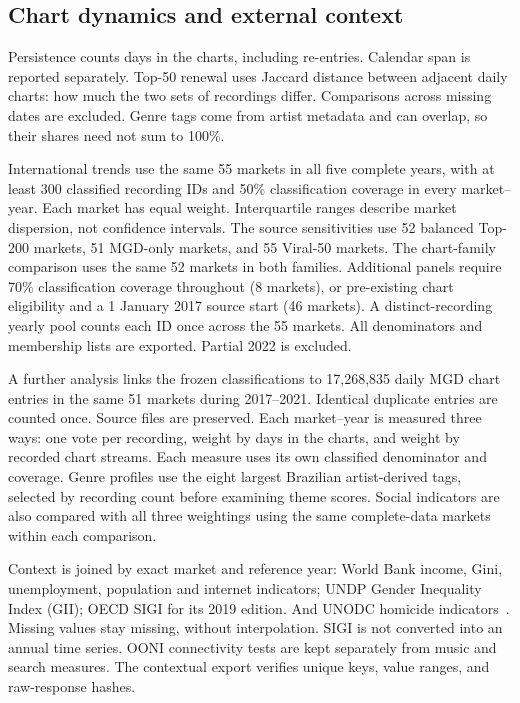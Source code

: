 \documentclass[10pt,a4paper,twocolumn]{article}
\begin{document}
\subsection{Chart dynamics and external context}
Persistence counts days in the charts, including re-entries. Calendar span is reported separately. Top-50 renewal uses Jaccard distance between adjacent daily charts: how much the two sets of recordings differ. Comparisons across missing dates are excluded. Genre tags come from artist metadata and can overlap, so their shares need not sum to 100\%.

International trends use the same 55 markets in all five complete years, with at least 300 classified recording IDs and 50\% classification coverage in every market--year. Each market has equal weight. Interquartile ranges describe market dispersion, not confidence intervals. The source sensitivities use 52 balanced Top-200 markets, 51 MGD-only markets, and 55 Viral-50 markets. The chart-family comparison uses the same 52 markets in both families. Additional panels require 70\% classification coverage throughout (8 markets), or pre-existing chart eligibility and a 1 January 2017 source start (46 markets). A distinct-recording yearly pool counts each ID once across the 55 markets. All denominators and membership lists are exported. Partial 2022 is excluded.

A further analysis links the frozen classifications to 17,268,835 daily MGD chart entries in the same 51 markets during 2017--2021. Identical duplicate entries are counted once. Source files are preserved. Each market--year is measured three ways: one vote per recording, weight by days in the charts, and weight by recorded chart streams. Each measure uses its own classified denominator and coverage. Genre profiles use the eight largest Brazilian artist-derived tags, selected by recording count before examining theme scores. Social indicators are also compared with all three weightings using the same complete-data markets within each comparison.

Context is joined by exact market and reference year: World Bank income, Gini, unemployment, population and internet indicators; UNDP Gender Inequality Index (GII); OECD SIGI for its 2019 edition. And UNODC homicide indicators~\cite{wdi,gii,sigi,homicide}. Missing values stay missing, without interpolation. SIGI is not converted into an annual time series. OONI connectivity tests are kept separately from music and search measures. The contextual export verifies unique keys, value ranges, and raw-response hashes.
\end{document}
